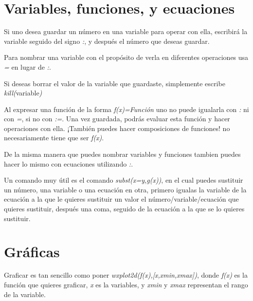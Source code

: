 \documentclass{article}
\begin{document}
\section{Variables, funciones, y ecuaciones}

Si uno desea guardar un número en una variable para operar con ella, escribirá la variable seguido del signo \textit{:}, y después el número que deseas guardar.

Para nombrar una variable con el propósito de verla en diferentes operaciones usa \textit{=} en lugar de \textit{:}.

\vspace{0.3cm}

Si deseas borrar el valor de la variable que guardaste, simplemente escribe \textit{kill(}variable\textit{)}

\vspace{0.3cm}

Al expresar una función de la forma \textit{f(x)=Función} uno no puede igualarla con \textit{:} ni con \textit{=}, si no con \textit{:=}. Una vez guardada, podrás evaluar esta función y hacer operaciones con ella. ¡También puedes hacer composiciones de funciones! no necesariamente tiene que ser \textit{f(x)}.

De la misma manera que puedes nombrar variables y funciones tambien puedes hacer lo mismo con ecuaciones utilizando \textit{:}.

\vspace{0.3cm}

Un comando muy útil es el comando \textit{subst(x=y,g(x))}, en el cual puedes sustituir un número, una variable o una ecuación en otra, primero igualas la variable de la ecuación a la que le quieres sustituir un valor el número/variable/ecuación que quieres sustituir, después una coma, seguido de la ecuación a la que se lo quieres sustituir.




\section{Gráficas}

Graficar es tan sencillo como poner \textit{wxplot2d(f(x),[x,xmin,xmax])}, donde \textit{f(x)} es la función que quieres graficar, \textit{x} es la variables, y \textit{xmin} y \textit{xmax} representan el rango de la variable.
\end{document}
